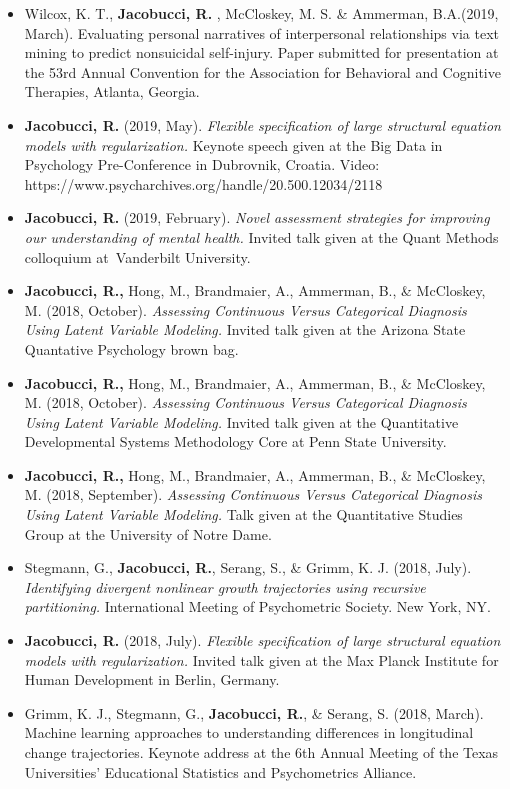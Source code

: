\documentclass[letterpaper,10pt]{article}
\begin{document}
\begin{itemize}
\item[] Wilcox, K. T., \textbf{Jacobucci, R.} , McCloskey, M. S. \& Ammerman, B.A.(2019, March). Evaluating personal narratives of interpersonal relationships via text mining to predict nonsuicidal self-injury. Paper submitted for presentation at the 53rd Annual Convention for the Association for Behavioral and Cognitive Therapies, Atlanta, Georgia.
%
\item[]\textbf{Jacobucci, R.} (2019, May). \emph{Flexible specification of large structural equation models with regularization.} Keynote speech given at the Big Data in Psychology Pre-Conference in Dubrovnik, Croatia. Video: https://www.psycharchives.org/handle/20.500.12034/2118
%
\item[]\textbf{Jacobucci, R.} (2019, February). \emph{Novel assessment strategies for improving our understanding of mental health.} Invited talk given at the Quant Methods colloquium at Vanderbilt University.
%
\item[]\textbf{Jacobucci, R.,} Hong, M., Brandmaier, A., Ammerman, B., \& McCloskey, M. (2018, October). \emph{Assessing Continuous Versus Categorical Diagnosis Using Latent Variable Modeling.} Invited talk given at the Arizona State Quantative Psychology brown bag.
%
\item[]\textbf{Jacobucci, R.,} Hong, M., Brandmaier, A., Ammerman, B., \& McCloskey, M. (2018, October). \emph{Assessing Continuous Versus Categorical Diagnosis Using Latent Variable Modeling.} Invited talk given at the Quantitative Developmental Systems Methodology Core at Penn State University.
%
\item[]\textbf{Jacobucci, R.,} Hong, M., Brandmaier, A., Ammerman, B., \& McCloskey, M. (2018, September). \emph{Assessing Continuous Versus Categorical Diagnosis Using Latent Variable Modeling.} Talk given at the Quantitative Studies Group at the University of Notre Dame.
%
\item[]Stegmann, G., \textbf{Jacobucci, R.}, Serang, S., \& Grimm, K. J. (2018, July). \emph{Identifying divergent nonlinear growth trajectories using recursive partitioning.} International Meeting of Psychometric Society. New York, NY.
%
\item[]\textbf{Jacobucci, R.} (2018, July). \emph{Flexible specification of large structural equation models with regularization.} Invited talk given at the Max Planck Institute for Human Development in Berlin, Germany.
%
\item[]Grimm, K. J., Stegmann, G., \textbf{Jacobucci, R.}, \& Serang, S. (2018, March). Machine learning approaches to understanding differences in longitudinal change trajectories. Keynote address at the 6th Annual Meeting of the Texas Universities' Educational Statistics and Psychometrics Alliance.

\end{itemize}
\end{document}
